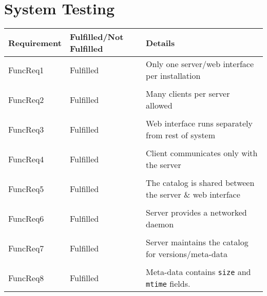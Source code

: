 \section{System Testing}
\label{sec:appendix-system-testing}

\begin{longtable}{ l l p{5cm} }
    \toprule
    Requirement         & Fulfilled/Not Fulfilled   & Details
    \\ \midrule
    FuncReq1            & Fulfilled                 & Only one server/web
                                                      interface per
                                                      installation
    \\ \\
    FuncReq2            & Fulfilled                 & Many clients per
                                                      server allowed
    \\ \\
    FuncReq3            & Fulfilled                 & Web interface runs
                                                      separately from rest
                                                      of system
    \\ \\
    FuncReq4            & Fulfilled                 & Client communicates
                                                      only with the server
    \\ \\
    FuncReq5            & Fulfilled                 & The catalog is shared
                                                      between the server \&
                                                      web interface
    \\ \\
    FuncReq6            & Fulfilled                 & Server provides
                                                      a networked daemon
    \\ \\
    FuncReq7            & Fulfilled                 & Server maintains the
                                                      catalog for
                                                      versions/meta-data
    \\ \\
    FuncReq8            & Fulfilled                 & Meta-data contains
                                                      \verb!size! and
                                                      \verb!mtime! fields.

\end{longtable}
